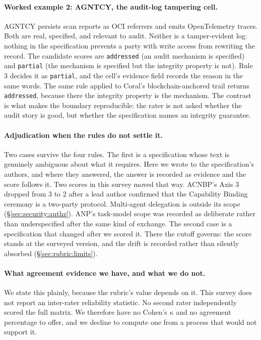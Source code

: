 \paragraph{Worked example 2: AGNTCY, the audit-log
tampering cell.}
AGNTCY persists scan reports as OCI referrers and emits
OpenTelemetry traces. Both are real, specified, and
relevant to audit. Neither is a tamper-evident log: nothing
in the specification prevents a party with write access
from rewriting the record. The candidate scores are
\texttt{addressed} (an audit mechanism is specified) and
\texttt{partial} (the mechanism is specified but the
integrity property is not). Rule 3 decides it as
\texttt{partial}, and the cell's evidence field records the
reason in the same words. The same rule applied to Coral's
blockchain-anchored trail returns \texttt{addressed},
because there the integrity property is the mechanism. The
contrast is what makes the boundary reproducible: the rater
is not asked whether the audit story is good, but whether
the specification names an integrity guarantee.

\paragraph{Adjudication when the rules do not settle it.}
Two cases survive the four rules. The first is a
specification whose text is genuinely ambiguous about what
it requires. Here we wrote to the specification's authors,
and where they answered, the answer is recorded as evidence
and the score follows it. Two scores in this survey moved
that way. ACNBP's Axis 3 dropped from 3 to 2 after a lead
author confirmed that the Capability Binding ceremony is a
two-party protocol. Multi-agent delegation is outside its
scope (\S\ref{sec:security:authz}). ANP's task-model scope
was recorded as deliberate rather than underspecified after
the same kind of exchange. The second
case is a specification that changed after we scored it.
There the cutoff governs: the score stands at the surveyed
version, and the drift is recorded rather than silently
absorbed (\S\ref{sec:rubric:limits}).

\paragraph{What agreement evidence we have, and what we do
not.}
We state this plainly, because the rubric's value depends
on it. This survey does not report an inter-rater
reliability statistic. No second rater independently scored
the full matrix. We therefore have no Cohen's $\kappa$ and
no agreement percentage to offer, and we decline to compute
one from a process that would not support it.

